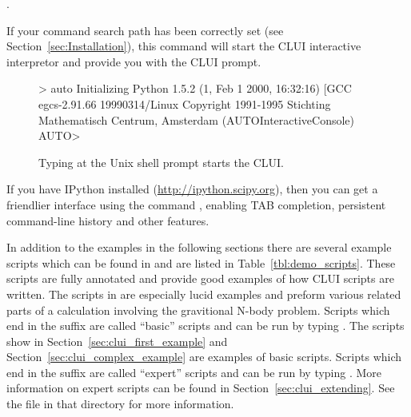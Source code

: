 \documentclass[12pt]{report}
\begin{document}
 \centerline {.}

 If your command search path has been correctly set (see
 Section~\ref{sec:Installation}), this command will start the \AUTO CLUI
 interactive interpretor and provide you with the \AUTO CLUI prompt.

 \begin{figure}[htbp]
 {\small 
 \begin{center} \begin{boxedverbatim}
 > auto
 Initializing
 Python 1.5.2 (1, Feb  1 2000, 16:32:16)  [GCC egcs-2.91.66 19990314/Linux 
 Copyright 1991-1995 Stichting Mathematisch Centrum, Amsterdam
 (AUTOInteractiveConsole)
 AUTO> 
 \end{boxedverbatim}
 \end{center}
 }
 \caption[Starting the \AUTO CLUI.]
 {Typing  at the Unix shell prompt starts the
 \AUTO CLUI.  }
 \label{exa:clui_starting}
 \end{figure}

 If you have IPython installed (\url{http://ipython.scipy.org}), then
 you can get a friendlier interface using the command
 , enabling TAB completion, persistent command-line
 history and other features.

 In addition to the examples in the following sections there are
 several example scripts which can be found in
  and are listed in
 Table~\ref{tbl:demo_scripts}.  These scripts are fully annotated and
 provide good examples of how \AUTO CLUI scripts are written.  The
 scripts in  are especially lucid
 examples and preform various related parts of a calculation involving
 the gravitional N-body problem.  
 Scripts which end in the
 suffix  are called ``basic'' scripts and can
 be run by typing .
 The scripts show in Section~\ref{sec:clui_first_example}
 and Section~\ref{sec:clui_complex_example} are examples
 of basic scripts.
 Scripts which end in the
 suffix  are called ``expert'' scripts and can
 be run by typing .
 More information on expert scripts can be 
 found in Section~\ref{sec:clui_extending}.
 See the  file in that
 directory for more information.
\end{document}
